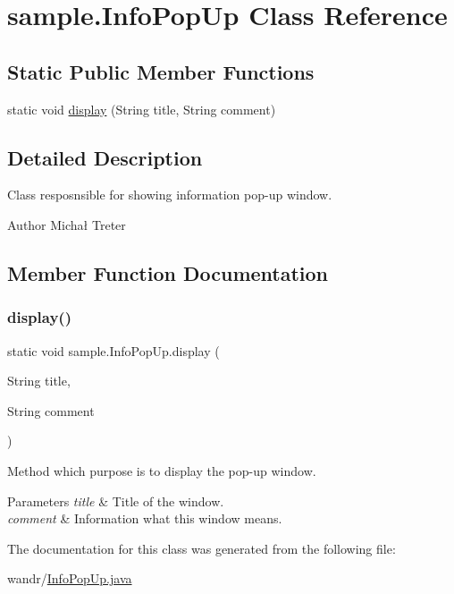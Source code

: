\hypertarget{classsample_1_1_info_pop_up}{}\section{sample.\+Info\+Pop\+Up Class Reference}
\label{classsample_1_1_info_pop_up}
\subsection*{Static Public Member Functions}
\begin{DoxyCompactItemize}
\item 
static void \hyperlink{classsample_1_1_info_pop_up_a42e2312fac2326e716bfc1a9a932117a}{display} (String title, String comment)
\end{DoxyCompactItemize}


\subsection{Detailed Description}
Class resposnsible for showing information pop-\/up window. \begin{DoxyAuthor}{Author}
Michał Treter 
\end{DoxyAuthor}


\subsection{Member Function Documentation}
\mbox{\label{classsample_1_1_info_pop_up_a42e2312fac2326e716bfc1a9a932117a}} 
\subsubsection{\texorpdfstring{display()}{display()}}
{\footnotesize\ttfamily static void sample.\+Info\+Pop\+Up.\+display (\begin{DoxyParamCaption}\item[{String}]{title,  }\item[{String}]{comment }\end{DoxyParamCaption})\hspace{0.3cm}{\ttfamily [static]}}

Method which purpose is to display the pop-\/up window. 
\begin{DoxyParams}{Parameters}
{\em title} & Title of the window. \\
\hline
{\em comment} & Information what this window means. \\
\hline
\end{DoxyParams}


The documentation for this class was generated from the following file\+:\begin{DoxyCompactItemize}
\item 
wandr/\hyperlink{_info_pop_up_8java}{Info\+Pop\+Up.\+java}\end{DoxyCompactItemize}
